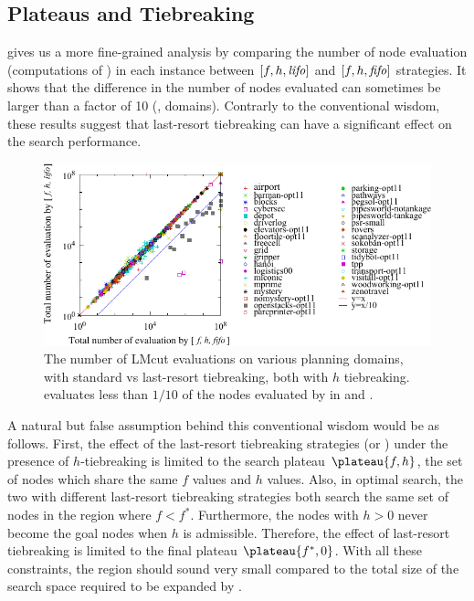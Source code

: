 \subsection{Plateaus and Tiebreaking}

 gives us a
more fine-grained analysis by comparing the number of node evaluation
(computations of \lmcut) in each instance between $[f,h,{\mbox{\textit{lifo}}}]$ and $[f,h,{\mbox{\textit{fifo}}}]$ strategies.
It shows that the difference in the number of nodes
evaluated can sometimes be larger than a factor of 10 (,  domains).
Contrarly to the conventional wisdom, 
these results suggest that last-resort tiebreaking can have a significant effect on
the search performance.

\begin{figure}[htbp]
 \centering {}
 \includegraphics{tables/aaai16-30min-5min-cut/aaai16prelim3/evaluated-lmcut_ff-lmcut_lf.pdf}
 \caption{The number of LMcut evaluations on various planning domains,
 with standard \fifo vs \lifo last-resort tiebreaking, both with $h$
 tiebreaking. \lifo evaluates  less than $1/10$ of the nodes evaluated
 by \fifo in  and . 
 }
 \label{fig:f-h-eval}
\end{figure}



A natural but false assumption behind this conventional wisdom would be as follows.
% 
First, the effect of the last-resort tiebreaking strategies (\lifo or
\fifo) under the presence of $h$-tiebreaking is
limited to the search plateau $\plateau{f,h}$, the set of nodes which
share the same $f$ values and $h$ values.
% 
Also, in optimal search, the two \astar with
different last-resort tiebreaking strategies both search the same set of
nodes in the region where $f<f^*$.
% 
Furthermore, the nodes with $h>0$ never become the goal nodes when $h$ is admissible.
% 
Therefore, the effect of last-resort tiebreaking is limited to
the final plateau $\plateau{f^*,0}$.
% 
With all these constraints, the region should sound very small compared to the
total size of the search space required to be expanded by \astar.

